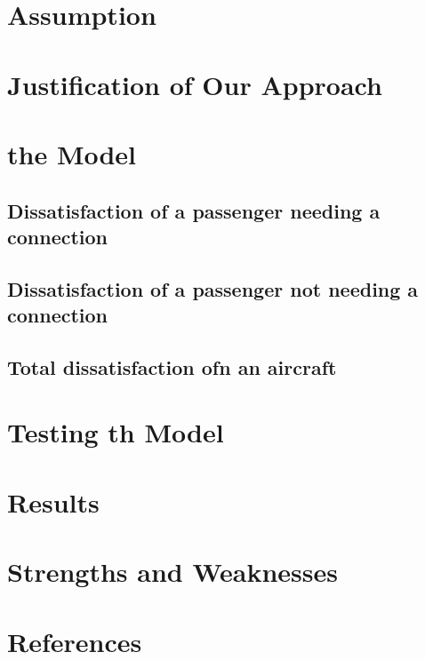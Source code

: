 \documentclass{mcmthesis}
\begin{document}
\section{Assumption}

\section{Justification of Our Approach}

\section{the Model}

\subsection{Dissatisfaction of a passenger needing a connection}

\subsection{Dissatisfaction of a passenger not needing a connection}

\subsection{Total dissatisfaction ofn an aircraft}

\section{Testing th Model}

\section{Results}

\section{Strengths and Weaknesses}

\section{References}
\end{document}
